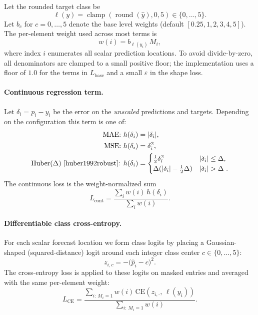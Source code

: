\documentclass[11pt, a4paper]{article}
\begin{document}
Let the rounded target class be
\begin{equation}
\ell(y) = \operatorname{clamp}(\operatorname{round}(\hat y),0,5) \in \{0,\dots,5\}.
\end{equation}
Let $b_c$ for $c=0,\dots,5$ denote the base level weights (default $[0.25,1,2,3,4,5]$). The per-element weight used across most terms is
\begin{equation}
w(i) = b_{\ell( y_i)}\, M_i,
\end{equation}
where index $i$ enumerates all scalar prediction locations. To avoid divide-by-zero, all denominators are clamped to a small positive floor; the implementation uses a floor of $1.0$ for the terms in $L_{\mathrm{base}}$ and a small $\varepsilon$ in the shape loss.

\paragraph{Continuous regression term.} Let $\delta_i = p_i - y_i$ be the error on the \emph{unscaled} predictions and targets. Depending on the configuration this term is one of:
\begin{align}
\text{MAE: } & h(\delta_i) = |\delta_i|,\\
\text{MSE: } & h(\delta_i) = \delta_i^2,\\
\text{Huber}(\Delta)\text{~\cite{huber1992robust}: }  & h(\delta_i) = \begin{cases} \tfrac{1}{2}\delta_i^2 & |\delta_i| \le \Delta,\\ \Delta(|\delta_i| - \tfrac{1}{2}\Delta) & |\delta_i|>\Delta~.\end{cases}
\end{align}
The continuous loss is the weight-normalized sum
\begin{equation}
L_{\mathrm{cont}} = \frac{\sum_i w(i)\, h(\delta_i)}{\sum_i w(i)}.
\end{equation}

\paragraph{Differentiable class cross-entropy.} For each scalar forecast location we form class logits by placing a Gaussian-shaped (squared-distance) logit around each integer class center $c\in\{0,\dots,5\}$:
\begin{equation}
z_{i,c} = -\bigl(\hat p_i - c\bigr)^2.
\end{equation}
The cross-entropy loss is applied to these logits on masked entries and averaged with the same per-element weight:
\begin{equation}
L_{\mathrm{CE}} = \frac{\sum_{i:\,M_i=1} w(i)\,\mathrm{CE}(z_{i,\cdot},\,\ell(y_i))}{\sum_{i:\,M_i=1} w(i)}.
\end{equation}
\end{document}
